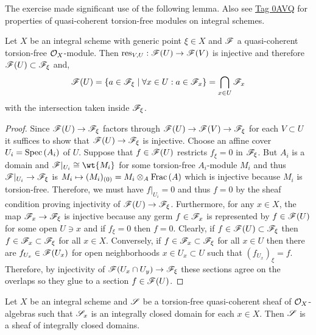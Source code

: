\documentclass[12pt]{article}
\begin{document}
\begin{rmk}
The exercise made significant use of the following lemma. Also see \href{https://stacks.math.columbia.edu/tag/0AVQ}{Tag 0AVQ} for properties of quasi-coherent torsion-free modules on integral schemes.
\end{rmk}

\begin{lemma}
Let $X$ be an integral scheme with generic point $\xi \in X$ and $\mathscr{F}$ a quasi-coherent torsion-free $\mathcal{O}_{X}$-module. Then $\mathrm{res}_{V,U} : \mathscr{F}(U) \to \mathscr{F}(V)$ is injective and therefore $\mathscr{F}(U) \subset \mathscr{F}_\xi$ and,
\[ \mathscr{F}(U) = \{ a \in \mathscr{F}_\xi \mid \forall x \in U : a \in \mathscr{F}_x \} = \bigcap_{x \in U} \mathscr{F}_x \]
with the intersection taken inside $\mathscr{F}_\xi$.
\end{lemma}

\begin{proof}
Since $\mathscr{F}(U) \to \mathscr{F}_\xi$ factors through $\mathscr{F}(U) \to \mathscr{F}(V) \to \mathscr{F}_\xi$ for each $V \subset U$ it suffices to show that $\mathscr{F}(U) \to \mathscr{F}_\xi$ is injective.
Choose an affine cover $U_i = \mathrm{Spec}\left( A_i \right)$ of $U$. Suppose that $f \in \mathscr{F}(U)$ restricts $f_\xi = 0$ in $\mathscr{F}_\xi$. But $A_i$ is a domain and $\F|_{U_i} \cong \wt{M_i}$ for some torsion-free $A_i$-module $M_i$ and thus $\mathscr{F}|_{U_i} \to \mathscr{F}_\xi$ is $M_i \mapsto (M_i)_{(0)} = M_i \otimes_A \mathrm{Frac}\left(A\right)$ which is injective because $M_i$ is torsion-free. Therefore, we must have $f|_{U_i} = 0$ and thus $f = 0$ by the sheaf condition proving injectivity of $\mathscr{F}(U) \to \mathscr{F}_\xi$. Furthermore, for any $x \in X$, the map $\mathscr{F}_x \to \mathscr{F}_\xi$ is injective because any germ $f \in \mathscr{F}_x$ is represented by $f \in \mathscr{F}(U)$ for some open $U \ni x$ and if $f_\xi = 0$ then $f = 0$. Clearly, if $f \in \mathscr{F}(U) \subset \mathscr{F}_\xi$ then $f \in \mathscr{F}_x \subset \mathscr{F}_\xi$ for all $x \in X$. Conversely, if $f \in \mathscr{F}_x \subset \mathscr{F}_\xi$ for all $x \in U$ then there are $f_{U_x} \in \mathscr{F}(U_x)$ for open neighborhoods $x \in U_x \subset U$ such that $(f_{U_x})_\xi = f$. Therefore, by injectivity of $\mathscr{F}(U_x \cap U_y) \to \mathscr{F}_\xi$ these sections agree on the overlaps so they glue to a section $f \in \mathscr{F}(U)$. 
\end{proof}

\begin{lemma}
Let $X$ be an integral scheme and $\mathscr{S}$ be a torsion-free quasi-coherent sheaf of $\mathcal{O}_{X}$-algebras such that $\mathscr{S}_x$ is an integrally closed domain for each $x \in X$. Then $\mathscr{S}$ is a sheaf of integrally closed domains.
\end{lemma}
\end{document}
